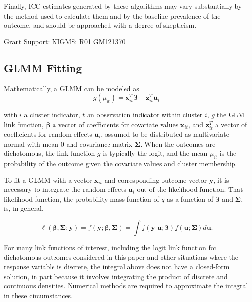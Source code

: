 \documentclass[Afour,times,sagev,doublespace]{sagej}
\begin{document}
Finally, ICC estimates generated by these algorithms may vary substantially by the method used to calculate them and by the baseline prevalence of the outcome, and should be approached with a degree of skepticism.







\begin{funding}
Grant Support: NIGMS: R01 GM121370
\end{funding}

\begin{sm}

\subsection{GLMM Fitting}
Mathematically, a GLMM can be modeled as
    \begin{equation}
        g(\mu_{it})=\mathbf{x}^T_{it} \boldsymbol{\beta} + \mathbf{z}^T_{it}\mathbf{u}_i
    \end{equation}
    
    with
 $i$ a cluster indicator, $t$ an observation indicator within cluster $i$, $g$ the GLM link function, $\boldsymbol{\beta}$ a vector of coefficients for covariate values $\mathbf{x}_{it}$, and $\mathbf{z}^T_{it}$ a vector of coefficients for random effects $\mathbf{u}_i$, assumed to be distributed as multivariate normal with mean $0$ and covariance matrix $\mathbf{\Sigma}$. When the outcomes are dichotomous, the link function $g$ is typically the logit, and the mean $\mu_{it}$ is the probability of the outcome given the covariate values and cluster membership.
 
To fit a GLMM with a vector $\mathbf{x}_{it}$ and corresponding outcome vector $\mathbf{y}$, it is necessary to integrate the random effects $\mathbf{u}_i$ out of the likelihood function\cite{rodriguez_assessment_1995}. That likelihood function, the probability mass function of $y$ as a function of $\boldsymbol{\beta}$ and $\mathbf{\Sigma}$\cite{agresti_categorical_2013}, is, in general,

\begin{equation}
 \ell(\boldsymbol{\beta}, \mathbf{\Sigma} ; \mathbf{y})=f(\mathbf{y};\boldsymbol{\beta}, \mathbf{\Sigma})=\int f(\mathbf{y}|\mathbf{u};\boldsymbol{\beta})f(\mathbf{u}; \mathbf{\Sigma})d\mathbf{u}.   
\end{equation}

For many link functions of interest, including the logit link function for dichotomous outcomes considered in this paper and other situations where the response variable is discrete, the integral above does not have a closed-form solution, in part because it involves integrating the product of discrete and continuous densities\cite{ng_estimation_2006}. Numerical methods are required to approximate the integral in these circumstances.


\end{sm}
\end{document}

